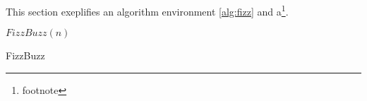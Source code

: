 
This section exeplifies an algorithm environment \ref{alg:fizz} and
a\footnote{footnote}.

\begin{algorithm}{$FizzBuzz(n)$}
  \caption{FizzBuzz}
  \label{alg:fizz}
  \begin{algorithmic}[2]
      \ELSE
      \ENDIF
    \ENDFOR
  \end{algorithmic}
\end{algorithm}
